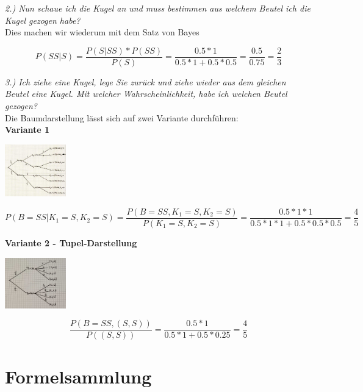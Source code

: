 \documentclass[a4paper]{article}
\newenvironment{Figure}
	{\par\medskip\noindent\minipage{\linewidth}}
	{\endminipage\par\medskip}
\theoremstyle{definition}
\theoremstyle{example}
\begin{document}
\textit{2.) Nun schaue ich die Kugel an und muss bestimmen aus welchem Beutel ich die Kugel gezogen habe?}\\
Dies machen wir wiederum mit dem Satz von Bayes

\begin{equation}
P(SS|S) = \frac{P(S|SS) * P(SS)}{P(S)} = \frac{0.5*1}{0.5*1 + 0.5*0.5} = \frac{0.5}{0.75} = \frac{2}{3}
\end{equation}

\textit{3.) Ich ziehe eine Kugel, lege Sie zurück und ziehe wieder aus dem gleichen Beutel eine Kugel. Mit welcher Wahrscheinlichkeit, habe ich welchen Beutel gezogen?}\\
Die Baumdarstellung lässt sich auf zwei Variante durchführen:\\
\textbf{Variante 1}\\
\begin{Figure}
	\centering
	\includegraphics[width=100px]{img/MehrfachBaumVar1.jpg}
	\label{fig:Variante 1 der Baum-Darstellung}
\end{Figure}
\begin{equation}
P(B=SS | K_1 = S, K_2 = S) = \frac{P(B=SS, K_1=S, K_2=S)}{P(K_1=S,K_2=S)} = \frac{0.5*1*1}{0.5*1*1+0.5*0.5*0.5} = \frac{4}{5}
\end{equation}

\textbf{Variante 2 - Tupel-Darstellung}\\
\begin{Figure}
	\centering
	\includegraphics[width=100px]{img/MehrfachBaumVar2.jpg}
	\label{fig:Variante 2 der Baum-Darstellung}
\end{Figure}
\begin{equation}
\frac{P(B=SS, (S,S))}{P((S,S))}=\frac{0.5*1}{0.5*1+0.5*0.25}=\frac{4}{5}
\end{equation}
\section{Formelsammlung}
\end{document}
